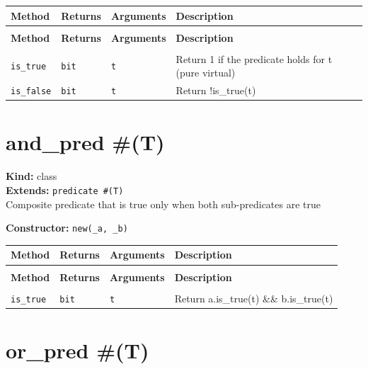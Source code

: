 \documentclass[11pt,letterpaper]{report}
\begin{document}
\begin{xltabular}{\linewidth}{>{\small}p{1.35in} >{\small}p{1.25in} >{\small}p{0.95in} >{\small}X}
\toprule
\textbf{Method} & \textbf{Returns} & \textbf{Arguments} & \textbf{Description} \\
\midrule
\endfirsthead
{} \\
\midrule
\textbf{Method} & \textbf{Returns} & \textbf{Arguments} & \textbf{Description} \\
\midrule
\endhead
\midrule
{} \\
\endfoot
\bottomrule
\endlastfoot
\texttt{is\_true} & \texttt{bit} & \texttt{t} & Return 1 if the predicate holds for t (pure virtual) \\
\texttt{is\_false} & \texttt{bit} & \texttt{t} & Return !is\_true(t) \\
\end{xltabular}

\section{and\_pred \#(T)}
\label{cls:andpredT}

\noindent\textbf{Kind:} class\\
\noindent\textbf{Extends:} \texttt{predicate \#(T)}\\
\noindent Composite predicate that is true only when both sub-predicates are true

\noindent\textbf{Constructor:} \texttt{new(\_a, \_b)}

\begin{xltabular}{\linewidth}{>{\small}p{1.35in} >{\small}p{1.25in} >{\small}p{0.95in} >{\small}X}
\toprule
\textbf{Method} & \textbf{Returns} & \textbf{Arguments} & \textbf{Description} \\
\midrule
\endfirsthead
{} \\
\midrule
\textbf{Method} & \textbf{Returns} & \textbf{Arguments} & \textbf{Description} \\
\midrule
\endhead
\midrule
{} \\
\endfoot
\bottomrule
\endlastfoot
\texttt{is\_true} & \texttt{bit} & \texttt{t} & Return a.is\_true(t) \&\& b.is\_true(t) \\
\end{xltabular}

\section{or\_pred \#(T)}
\label{cls:orpredT}
\end{document}
